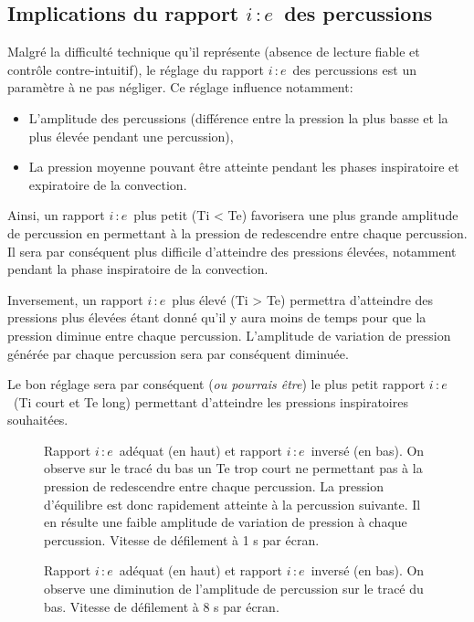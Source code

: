 \documentclass[letterpaper, titlepage]{article}
\def\ie{$i\, \colon e$}
\begin{document}
\subsection{Implications du rapport \ie\ des
percussions}

Malgré la difficulté technique qu'il représente (absence de lecture
fiable et contrôle contre-intuitif), le réglage du rapport \ie\ des
percussions est un paramètre à ne pas négliger. Ce réglage influence
notamment:

\begin{itemize}
\item
  L'amplitude des percussions (différence entre la pression la plus basse
  et la plus élevée pendant une percussion),
\item
  La pression moyenne pouvant être atteinte
  pendant les phases inspiratoire et expiratoire de la convection.
\end{itemize}

Ainsi, un rapport \ie\ plus petit (Ti < Te) favorisera une plus
grande amplitude de percussion en permettant à la pression de
redescendre entre chaque percussion. Il sera par conséquent plus
difficile d'atteindre des pressions élevées, notamment pendant la phase
inspiratoire de la convection.

Inversement, un rapport \ie\ plus élevé (Ti > Te) permettra
d'atteindre des pressions plus élevées étant donné qu'il y aura moins de
temps pour que la pression diminue entre chaque percussion. L'amplitude
de variation de pression générée par chaque percussion sera par
conséquent diminuée.

Le bon réglage sera par conséquent ({\em ou pourrais être}) le plus petit rapport \ie\ (Ti court
et Te long) permettant d'atteindre les pressions inspiratoires
souhaitées.



\begin{figure*}
	
	\caption{Rapport \ie\ adéquat (en haut) et rapport \ie\ inversé (en
	bas). On observe sur le tracé du bas un Te trop court ne permettant pas
	à la pression de redescendre entre chaque percussion. La pression
	d'équilibre est donc rapidement atteinte à la percussion suivante. Il en
	résulte une faible amplitude de variation de pression à chaque
	percussion. Vitesse de défilement à 1 s par écran.}
	\label{figie1}
\end{figure*}

\begin{figure*}
	
	\caption{Rapport \ie\ adéquat (en haut) et rapport \ie\ inversé (en
	bas). On observe une diminution de l'amplitude de percussion sur le
	tracé du bas. Vitesse de défilement à 8 s par écran.}
	\label{figie8}
\end{figure*}
\end{document}

